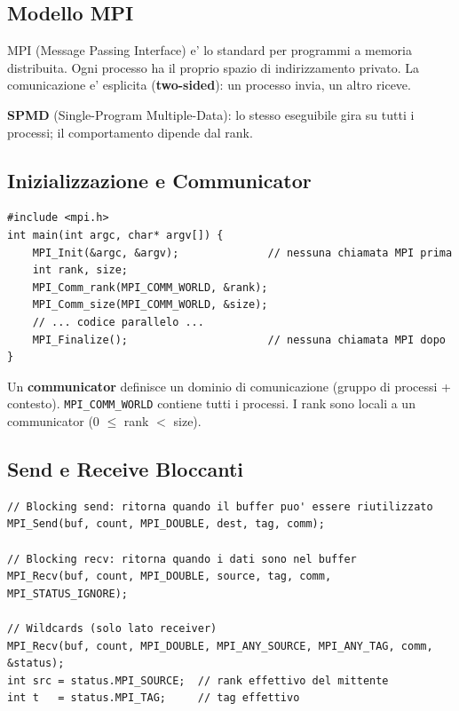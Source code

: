 \documentclass[11pt,a4paper]{article}
\theoremstyle{remark}
\begin{document}
\subsection{Modello MPI}

MPI (Message Passing Interface) e' lo standard per programmi a memoria distribuita. Ogni processo ha il proprio spazio di indirizzamento privato. La comunicazione e' esplicita (\textbf{two-sided}): un processo invia, un altro riceve.

\textbf{SPMD} (Single-Program Multiple-Data): lo stesso eseguibile gira su tutti i processi; il comportamento dipende dal rank.

\subsection{Inizializzazione e Communicator}

\begin{lstlisting}[style=cpp]
#include <mpi.h>
int main(int argc, char* argv[]) {
    MPI_Init(&argc, &argv);              // nessuna chiamata MPI prima
    int rank, size;
    MPI_Comm_rank(MPI_COMM_WORLD, &rank);
    MPI_Comm_size(MPI_COMM_WORLD, &size);
    // ... codice parallelo ...
    MPI_Finalize();                      // nessuna chiamata MPI dopo
}
\end{lstlisting}

Un \textbf{communicator} definisce un dominio di comunicazione (gruppo di processi + contesto). \lstinline|MPI_COMM_WORLD| contiene tutti i processi. I rank sono locali a un communicator (0 $\leq$ rank $<$ size).

\subsection{Send e Receive Bloccanti}

\begin{lstlisting}[style=cpp]
// Blocking send: ritorna quando il buffer puo' essere riutilizzato
MPI_Send(buf, count, MPI_DOUBLE, dest, tag, comm);

// Blocking recv: ritorna quando i dati sono nel buffer
MPI_Recv(buf, count, MPI_DOUBLE, source, tag, comm, MPI_STATUS_IGNORE);

// Wildcards (solo lato receiver)
MPI_Recv(buf, count, MPI_DOUBLE, MPI_ANY_SOURCE, MPI_ANY_TAG, comm, &status);
int src = status.MPI_SOURCE;  // rank effettivo del mittente
int t   = status.MPI_TAG;     // tag effettivo
\end{lstlisting}
\end{document}
